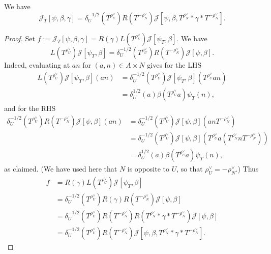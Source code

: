 \begin{lemma}\label{lem:cal-J-T-vs-cal-J}
  We have
  \begin{equation*}
    \mathcal{J}_T[\psi,\beta,\gamma] =  \delta_U^{-1/2}(T^{\rho_U^\vee}) R(T^{-\rho_N^\vee}) \mathcal{J}[\psi,\beta, T^{\rho_N^\vee} \ast \gamma \ast T^{- \rho_N^\vee }].
  \end{equation*}
\end{lemma}
\begin{proof}
  Set $f := \mathcal{J}_T[\psi,\beta,\gamma] = R(\gamma) L(T^{\rho_U^\vee }) \mathcal{J}[\psi_T,\beta]$.  We have
  \begin{equation*}
    L(T^{\rho_U^\vee}) \mathcal{J}[\psi_T,\beta] = \delta_U^{-1/2}(T^{\rho_U^\vee}) R(T^{-\rho_N^\vee}) \mathcal{J}[\psi,\beta].
  \end{equation*}
  Indeed, evaluating at $a n$ for $(a,n) \in A \times N$ gives for the LHS
  \begin{align*}
    L(T^{\rho_U^\vee}) \mathcal{J}[\psi_T,\beta](a n) &=
                                                        \delta_U^{-1/2}(T^{\rho_U^\vee})  \mathcal{J}[\psi_T,\beta](T^{\rho_U^\vee} a n) \\
                                                      &=
                                                        \delta_U^{1/2}(a) \beta(T^{\rho_U^\vee} a) \psi_T(n),
  \end{align*}
  and for the RHS
  \begin{align*}
    \delta_U^{-1/2}(T^{\rho_U^\vee})  R(T^{-\rho_N^\vee}) \mathcal{J}[\psi,\beta](a n)
    &=
      \delta_U^{-1/2}(T^{\rho_U^\vee})  \mathcal{J}[{\psi,\beta}](a n T^{-\rho_N^\vee}) \\
    &=
      \delta_U^{-1/2}(T^{\rho_U^\vee})   \mathcal{J}[{\psi,\beta}](T^{\rho_U^\vee} a (T^{\rho_N^\vee} n T^{-\rho_N^\vee})) \\
    &=
      \delta_U^{1/2}(a) \beta(T^{\rho_U^\vee} a) \psi_T(n),
  \end{align*}
  as claimed.  (We have used here that $N$ is opposite to $U$, so that $\rho_U^\vee = - \rho_N^\vee$.)  Thus
  \begin{align*}
    f &=
        R(\gamma)     L(T^{\rho_U^\vee}) \mathcal{J}[\psi_T,\beta] \\
      &= \delta_U^{-1/2}(T^{\rho_U^\vee}) R(\gamma) R(T^{-\rho_N^\vee}) \mathcal{J}[\psi,\beta] \\
      &= \delta_U^{-1/2}(T^{\rho_U^\vee}) R(T^{-\rho_N^\vee}) R(T^{\rho_N^\vee} \ast \gamma \ast T^{- \rho_N^\vee }) \mathcal{J}[\psi,\beta] \\
      &= \delta_U^{-1/2}(T^{\rho_U^\vee}) R(T^{-\rho_N^\vee}) \mathcal{J}[\psi,\beta,  T^{\rho_N^\vee} \ast \gamma \ast T^{- \rho_N^\vee }].
  \end{align*}
\end{proof}


